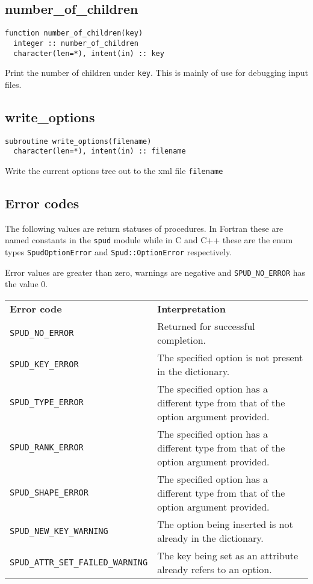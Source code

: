 \documentclass[a4paper, 11pt]{book}
\begin{document}
\subsection{number\_of\_children}

\begin{lstlisting}
function number_of_children(key)
  integer :: number_of_children
  character(len=*), intent(in) :: key
\end{lstlisting}

Print the number of children under \lstinline+key+. This is mainly of use
for debugging input files.

\subsection{write\_options}

\begin{lstlisting}
subroutine write_options(filename) 
  character(len=*), intent(in) :: filename
\end{lstlisting}

Write the current options tree out to the xml file \lstinline+filename+

\subsection{Error codes}\label{sec:error_codes}

The following values are return statuses of procedures. In Fortran these are
named constants in the \lstinline+spud+ module while in C and C++ these are
the enum types \lstinline+SpudOptionError+ and \lstinline+Spud::OptionError+
respectively. 

Error values are greater than zero, warnings are negative and
\lstinline+SPUD_NO_ERROR+ has the value 0.

\begin{tabular}{lp{8cm}}
  \textbf{Error code} & \textbf{Interpretation}\\
  \lstinline+SPUD_NO_ERROR+ & Returned for successful completion.\\
  \lstinline+SPUD_KEY_ERROR+ & The specified option is not present in the
  dictionary.\\
  \lstinline+SPUD_TYPE_ERROR+ & The specified option has a different type
  from that of the option argument provided.\\
  \lstinline+SPUD_RANK_ERROR+ & The specified option has a different type
  from that of the option argument provided.\\
  \lstinline+SPUD_SHAPE_ERROR+ & The specified option has a different type
  from that of the option argument provided.\\
  \lstinline+SPUD_NEW_KEY_WARNING+ & The option being inserted is not
  already in the dictionary.\\
  \lstinline+SPUD_ATTR_SET_FAILED_WARNING+ & The key being set as an
  attribute already refers to an option.
\end{tabular}
\end{document}
